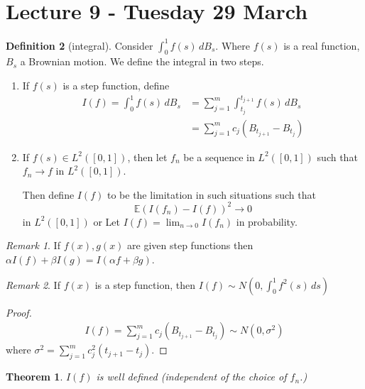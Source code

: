 \documentclass[10pt, oneside, reqno]{amsart}
\theoremstyle{plain}%
\newtheorem{thm}{Theorem}[section]
\theoremstyle{definition}
\newtheorem{defn}[thm]{Definition}
\theoremstyle{remark}
\newtheorem*{rem}{Remark}
\newcommand{\E}{\mathbb{E}}
\begin{document}
\section{Lecture 9 - Tuesday 29 March} %
\newcommand{\ito}{}
\label{sec:lecture_9_tuesday_29_march}
\begin{defn}[\ito integral]
    Consider $\int_0^1 f(s) \, dB_s$.  Where $f(s)$ is a real function, $B_s$ a Brownian motion.  We define the integral in two steps.  
    \begin{enumerate}[(1)]
        \item If $f(s)$ is a step function, define 
        \begin{align*}
            I(f) = \int_0^1 f(s) \, dB_s    &= \sum_{j=1}^m \int_{t_j}^{t_{j+1}} f(s) \, dB_s \\
                                    &= \sum_{j=1}^m c_j (B_{t_{j+1}} - B_{t_j})
        \end{align*}
        
        \item If $f(s) \in L^2([0,1])$, then let $f_n$ be a sequence in $L^2([0,1])$ such that $f_n \rightarrow f$ in $L^2([0,1])$.  
        
        Then define $I(f)$ to be the limitation in such situations such that \[
            \E(I(f_n) - I(f))^2 \rightarrow 0 
        \] in $L^2([0,1])$ or 
        Let $I(f) = \lim_{n \rightarrow 0} I(f_n)$ in probability.
    \end{enumerate}
    
    \begin{rem}
        If $f(x), g(x)$ are given step functions then $\alpha I(f) + \beta I(g) = I ( \alpha f + \beta g)$.
    \end{rem}
    \begin{rem}
        If $f(x)$ is a step function, then $I(f) \sim N(0, \int_0^1 f^2(s) \, ds)$
    \end{rem}
    \begin{proof}
        \begin{align*}
            I(f) = \sum_{j=1}^m c_j (B_{t_{j+1}} - B_{t_j}) \sim N(0, \sigma^2) 
        \end{align*} where $\sigma^2 = \sum_{j=1}^m c_j^2 (t_{j+1} - t_j)$.
    \end{proof}
    
    \begin{thm}
        $I(f)$ is well defined (independent of the choice of $f_n$.)
    \end{thm}
    

\end{defn}
\end{document}
